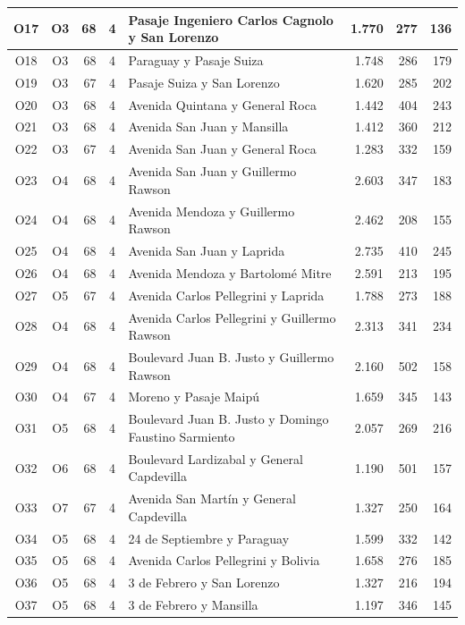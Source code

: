 \begin{longtable}{|c|c|r|c|p{4.2cm}|r|r|r|}
O17 & O3 & 68 & 4 & Pasaje Ingeniero Carlos Cagnolo y San Lorenzo & 1.770 & 277 & 136 \\ \hline
O18 & O3 & 68 & 4 & Paraguay y Pasaje Suiza & 1.748 & 286 & 179 \\ \hline
O19 & O3 & 67 & 4 & Pasaje Suiza y San Lorenzo & 1.620 & 285 & 202 \\ \hline
O20 & O3 & 68 & 4 & Avenida Quintana y General Roca & 1.442 & 404 & 243 \\ \hline
O21 & O3 & 68 & 4 & Avenida San Juan y Mansilla & 1.412 & 360 & 212 \\ \hline
O22 & O3 & 67 & 4 & Avenida San Juan y General Roca & 1.283 & 332 & 159 \\ \hline
O23 & O4 & 68 & 4 & Avenida San Juan y Guillermo Rawson & 2.603 & 347 & 183 \\ \hline
O24 & O4 & 68 & 4 & Avenida Mendoza y Guillermo Rawson & 2.462 & 208 & 155 \\ \hline
O25 & O4 & 68 & 4 & Avenida San Juan y Laprida & 2.735 & 410 & 245 \\ \hline
O26 & O4 & 68 & 4 & Avenida Mendoza y Bartolomé Mitre & 2.591 & 213 & 195 \\ \hline
O27 & O5 & 67 & 4 & Avenida Carlos Pellegrini y Laprida & 1.788 & 273 & 188 \\ \hline
O28 & O4 & 68 & 4 & Avenida Carlos Pellegrini y Guillermo Rawson & 2.313 & 341 & 234 \\ \hline
O29 & O4 & 68 & 4 & Boulevard Juan B. Justo y Guillermo Rawson & 2.160 & 502 & 158 \\ \hline
O30 & O4 & 67 & 4 & Moreno y Pasaje Maipú & 1.659 & 345 & 143 \\ \hline
O31 & O5 & 68 & 4 & Boulevard Juan B. Justo y Domingo Faustino Sarmiento & 2.057 & 269 & 216 \\ \hline
O32 & O6 & 68 & 4 & Boulevard Lardizabal y General Capdevilla & 1.190 & 501 & 157 \\ \hline
O33 & O7 & 67 & 4 & Avenida San Martín y General Capdevilla & 1.327 & 250 & 164 \\ \hline
O34 & O5 & 68 & 4 & 24 de Septiembre y Paraguay & 1.599 & 332 & 142 \\ \hline
O35 & O5 & 68 & 4 & Avenida Carlos Pellegrini y Bolivia & 1.658 & 276 & 185 \\ \hline
O36 & O5 & 68 & 4 & 3 de Febrero y San Lorenzo & 1.327 & 216 & 194 \\ \hline
O37 & O5 & 68 & 4 & 3 de Febrero y Mansilla & 1.197 & 346 & 145 \\ \hline

\end{longtable}
